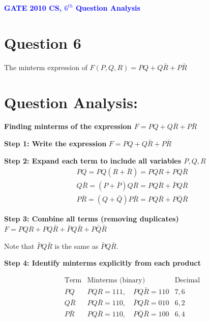 \documentclass[a4paper,12pt]{article}
\begin{document}
\thispagestyle{fancy}
\fancyhf{} %
\renewcommand{\headrulewidth}{0pt} %
\fancyfoot[C]{\thepage} %
\vspace*{1cm}
\begin{center}
	{\LARGE \textbf{\textcolor{blue}{GATE 2010 CS, $6^{th}$ Question Analysis}}}
\end{center}
\section*{\textbf{Question 6}}
The minterm expression of $F(P,Q,R)=PQ+Q\bar{R}+P\bar{R}$
\section*{\textbf{Question Analysis:}}
\textbf{Finding minterms of the expression $F=PQ+Q\bar{R}+P\bar{R}$}

\textbf{Step 1: Write the expression}
$
F = PQ +Q\bar{R} + P\bar{R}
$

\textbf{Step 2: Expand each term to include all variables \(P, Q, R\)}
$$
\begin{aligned}
PQ = PQ(R +\bar{R}) = PQR + PQ\bar{R} \\
Q\bar{R}= (P +\bar{P})Q\bar{R} = PQ\bar{R} + \bar{P}Q\bar{R} \\
P\bar{R}= (Q + \bar{Q})P\bar{R} = PQ\bar{R} + P\bar{Q}\bar{R}
\end{aligned}
$$

\textbf{Step 3: Combine all terms (removing duplicates)}
$
F =PQR + PQ\bar{R} + \bar{P}Q\bar{R} + P\bar{Q}\bar{R}
$

Note that \(\bar{P} Q \bar{R}\) is the same as \(\bar{P} Q \bar{R}\).

\textbf{Step 4: Identify minterms explicitly from each product}

$$
\begin{array}{c|c|c|c}
\text{Term} & \text{Minterms (binary)} & \text{Decimal} \\
\hline
PQ & P Q R = 111, \quad P Q \bar{R} = 110 & 7, 6 \\
Q\bar{R} & P Q \bar{R} = 110, \quad \bar{P} Q \bar{R} = 010 & 6, 2 \\
P\bar{R} & P Q \bar{R} = 110, \quad P \bar{Q} \bar{R} = 100 & 6, 4 \\
\end{array}
$$
\end{document}
